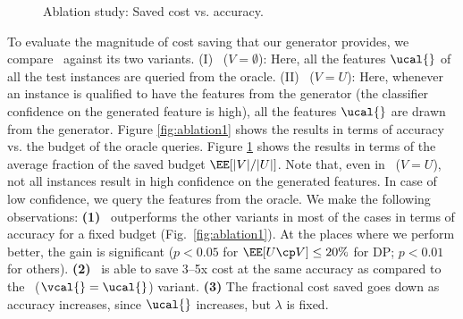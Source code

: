 \documentclass[letterpaper]{article}
\begin{document}
\begin{figure}[!t]
\begin{minipage}{.40\textwidth}
        \caption{\small Ablation study: Saved cost  vs. accuracy.}
        \label{fig:ablation2}
    \end{minipage}
\end{figure}
To evaluate the magnitude of cost saving that our generator provides, we compare \our\ against its two variants.  (I) \our\ ($V=\emptyset$): Here, all the features $\ucal{}$ of all the test instances are queried from the oracle.
(II) \our\ ($V=U$): Here, whenever an instance is qualified
to have the features from the generator (the classifier confidence on the generated feature is high), all the features $\ucal{}$ are drawn from the generator. Figure \ref{fig:ablation1} shows the results in terms of accuracy vs. the budget of the oracle queries.  Figure \ref{fig:ablation2} shows the results in terms of the average fraction of the saved budget $\EE[|V|/|U|]$. Note that,  even in \our\ ($V=U$), not all instances result in high confidence on the generated features. In case of low confidence, we query the features from the oracle.
We make the following observations:
\textbf{(1)} \our\ outperforms the other variants in most of the cases in terms of accuracy for a fixed budget (Fig.~\ref{fig:ablation1}).  At the places where we perform better, the gain is significant ($p<0.05$ for $\EE[U\cp V]\le 20\%$ for DP; $p<0.01$ for others).
\textbf{(2)} \our\ is able to save 3--5x cost at the same accuracy as compared to the \our\ ($\vcal{}=\ucal{}$) variant.
\textbf{(3)} The fractional cost saved goes down as accuracy increases, since $\ucal{}$ increases, but $\lambda$ is fixed.
\end{document}
